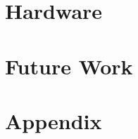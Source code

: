 \documentclass[final,12pt,twoside]{mcthesis}
\begin{document}
\newpage
\chapter{Hardware}



\newpage


\newpage
\chapter{Future Work}




\appendix
\chapter{Appendix}

\label{body end}
\end{document}
